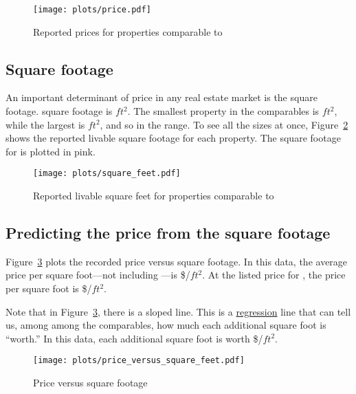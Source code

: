 \documentclass[
10pt, %
a4paper, %
oneside, %
headinclude,footinclude, %
BCOR5mm, %
]{scrartcl}
\begin{document}
\begin{figure}
\centering
\caption{Reported prices for properties comparable to \PropertyName{}} \label{fig:price}  
\texttt{[image: plots/price.pdf]} 
\end{figure}

\subsection{Square footage}
An important determinant of price in any real estate market is the square footage.
\PropertyName{} square footage is \PropertySize{} $ft^2$.
The smallest property in the comparables is \MinSize{}$ft^2$, while the largest is \MaxSize{}$ft^2$, and so \PropertyName{} \InSizeRange{} in the range. 
To see all the sizes at once, Figure~\ref{fig:square_feet} shows the reported livable square footage for each property.
The square footage for \PropertyName{} is plotted in pink. 

\begin{figure}
\centering
\caption{Reported livable square feet for properties comparable to \PropertyName{}} \label{fig:square_feet}  
\texttt{[image: plots/square\_feet.pdf]} 
\end{figure}

\subsection{Predicting the price from the square footage}

Figure~\ref{fig:price_versus_square_feet} plots the recorded price versus square footage.
In this data, the average price per square foot---not including \PropertyName{}---is \$\MeanPricePerFoot{}/$ft^2$.
At the listed price for \PropertyName{}, the price per square foot is \$\MeanPricePerFootFocal{}/$ft^2$.

Note that in Figure~\ref{fig:price_versus_square_feet}, there is a sloped line.
This is a \href{https://en.wikipedia.org/wiki/Linear_regression}{regression} line that can tell us, among among the comparables, how much each additional square foot is ``worth.''
In this data, each additional square foot is worth \$\MarginalPricePerFoot{}/$ft^2$. 

\begin{figure}
\centering
\caption{Price versus square footage} \label{fig:price_versus_square_feet}  
\texttt{[image: plots/price\_versus\_square\_feet.pdf]} 
\end{figure}
\end{document}

